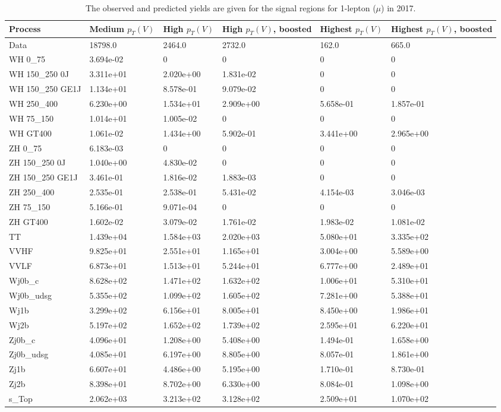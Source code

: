 \begin{table}
\centering
\caption[2017 1-lepton ($\mu$) signal selection yields]{
                  The observed and predicted yields are given for the
                  signal regions for 1-lepton ($\mu$) in 2017.
                  }
{\footnotesize
\begin{tabularx}{\textwidth}{|X|X|X|X|X|X|}
\hline
Process & Medium $p_{T}(V)$ & High $p_{T}(V)$ & High $p_{T}(V)$, boosted & Highest $p_{T}(V)$ & Highest $p_{T}(V)$, boosted \\
\hline
Data & 18798.0 & 2464.0 & 2732.0 & 162.0 & 665.0 \\
\hline
WH 0\_75 & 3.694e-02 & 0 & 0 & 0 & 0 \\
WH 150\_250 0J & 3.311e+01 & 2.020e+00 & 1.831e-02 & 0 & 0 \\
WH 150\_250 GE1J & 1.134e+01 & 8.578e-01 & 9.079e-02 & 0 & 0 \\
WH 250\_400 & 6.230e+00 & 1.534e+01 & 2.909e+00 & 5.658e-01 & 1.857e-01 \\
WH 75\_150 & 1.014e+01 & 1.005e-02 & 0 & 0 & 0 \\
WH GT400 & 1.061e-02 & 1.434e+00 & 5.902e-01 & 3.441e+00 & 2.965e+00 \\
ZH 0\_75 & 6.183e-03 & 0 & 0 & 0 & 0 \\
ZH 150\_250 0J & 1.040e+00 & 4.830e-02 & 0 & 0 & 0 \\
ZH 150\_250 GE1J & 3.461e-01 & 1.816e-02 & 1.883e-03 & 0 & 0 \\
ZH 250\_400 & 2.535e-01 & 2.538e-01 & 5.431e-02 & 4.154e-03 & 3.046e-03 \\
ZH 75\_150 & 5.166e-01 & 9.071e-04 & 0 & 0 & 0 \\
ZH GT400 & 1.602e-02 & 3.079e-02 & 1.761e-02 & 1.983e-02 & 1.081e-02 \\
\hline
TT & 1.439e+04 & 1.584e+03 & 2.020e+03 & 5.080e+01 & 3.335e+02 \\
VVHF & 9.825e+01 & 2.551e+01 & 1.165e+01 & 3.004e+00 & 5.589e+00 \\
VVLF & 6.873e+01 & 1.513e+01 & 5.244e+01 & 6.777e+00 & 2.489e+01 \\
Wj0b\_c & 8.628e+02 & 1.471e+02 & 1.632e+02 & 1.006e+01 & 5.310e+01 \\
Wj0b\_udsg & 5.355e+02 & 1.099e+02 & 1.605e+02 & 7.281e+00 & 5.388e+01 \\
Wj1b & 3.299e+02 & 6.156e+01 & 8.005e+01 & 8.450e+00 & 1.986e+01 \\
Wj2b & 5.197e+02 & 1.652e+02 & 1.739e+02 & 2.595e+01 & 6.220e+01 \\
Zj0b\_c & 4.096e+01 & 1.208e+00 & 5.408e+00 & 1.494e-01 & 1.658e+00 \\
Zj0b\_udsg & 4.085e+01 & 6.197e+00 & 8.805e+00 & 8.057e-01 & 1.861e+00 \\
Zj1b & 6.607e+01 & 4.486e+00 & 5.195e+00 & 1.710e-01 & 8.730e-01 \\
Zj2b & 8.398e+01 & 8.702e+00 & 6.330e+00 & 8.084e-01 & 1.098e+00 \\
s\_Top & 2.062e+03 & 3.213e+02 & 3.128e+02 & 2.509e+01 & 1.070e+02 \\
\hline
\end{tabularx}
}
\label{tab:sr-Wmn-2017}
\end{table}

